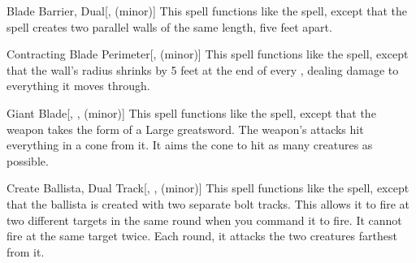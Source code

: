 \lowercase{\hypertarget{spell:Blade Barrier, Dual}{}}\label{spell:Blade Barrier, Dual}
\begin{freeability}[Rank 4]{\hypertarget{spell:Blade Barrier, Dual}{Blade Barrier, Dual}}[,  (minor)]
This spell functions like the  spell, except that the spell creates two parallel walls of the same length, five feet apart.
\end{freeability}
\vspace{0.25em}



\lowercase{\hypertarget{spell:Contracting Blade Perimeter}{}}\label{spell:Contracting Blade Perimeter}
\begin{freeability}[Rank 4]{\hypertarget{spell:Contracting Blade Perimeter}{Contracting Blade Perimeter}}[,  (minor)]
This spell functions like the  spell, except that the wall's radius shrinks by 5 feet at the end of every , dealing damage to everything it moves through.
\end{freeability}
\vspace{0.25em}



\lowercase{\hypertarget{spell:Giant Blade}{}}\label{spell:Giant Blade}
\begin{freeability}[Rank 4]{\hypertarget{spell:Giant Blade}{Giant Blade}}[, ,  (minor)]
This spell functions like the  spell, except that the weapon takes the form of a Large greatsword.
The weapon's attacks hit everything in a \areasmall cone from it.
It aims the cone to hit as many creatures as possible.
\end{freeability}
\vspace{0.25em}



\lowercase{\hypertarget{spell:Create Ballista, Dual Track}{}}\label{spell:Create Ballista, Dual Track}
\begin{freeability}[Rank 5]{\hypertarget{spell:Create Ballista, Dual Track}{Create Ballista, Dual Track}}[, ,  (minor)]
This spell functions like the  spell, except that the ballista is created with two separate bolt tracks.
This allows it to fire at two different targets in the same round when you command it to fire.
It cannot fire at the same target twice.
Each round, it attacks the two creatures farthest from it.
\end{freeability}
\vspace{0.25em}



